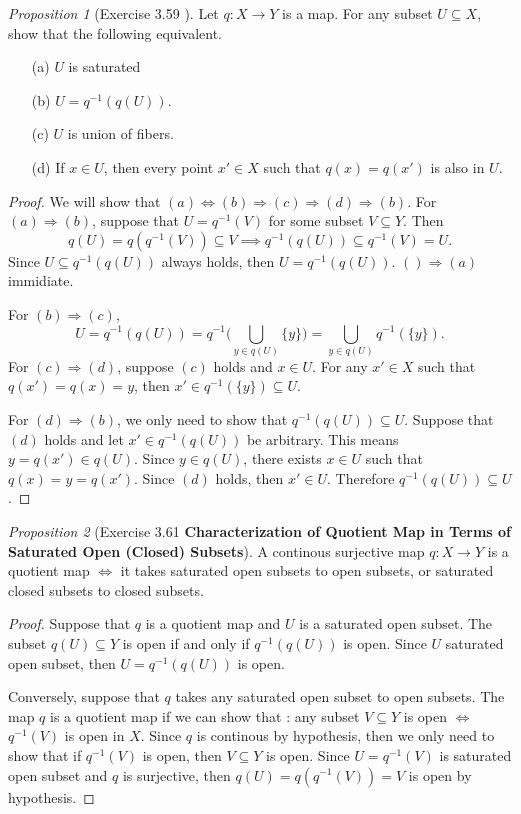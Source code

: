 \documentclass[a4paper]{article}
\theoremstyle{remark}
\newtheorem{prop}{Proposition}
\newcommand{\subhim}{\subseteq} %
\begin{document}
\begin{prop}[Exercise 3.59 \cite{LeeTM}]
	Let $q : X \to Y$ is a map. For any subset $U \subhim X$, show that the following equivalent.
	\begin{enumerate}[nolistsep]
		\item [(a)] $U$ is saturated 
		\item [(b)] $U = q^{-1}(q(U))$.
		\item [(c)] $U$ is union of fibers.
		\item [(d)] If $x \in U$, then every point $x'\in X$ such that $q(x) = q(x')$ is also in $U$.
	\end{enumerate}
\end{prop}
\begin{proof}
	We will show that $(a) \Leftrightarrow (b) \Rightarrow (c) \Rightarrow (d) \Rightarrow (b)$. For $(a) \Rightarrow (b)$, suppose that $U = q^{-1}(V)$ for some subset $V \subhim Y$. Then $$q(U) = q(q^{-1}(V)) \subhim V \implies q^{-1}(q(U)) \subhim q^{-1}(V) = U.$$
	Since $U \subhim q^{-1}(q(U))$ always holds, then $U = q^{-1}(q(U))$. $() \Rightarrow (a)$ immidiate.
	
	For $(b) \Rightarrow (c)$,
	$$
	U = q^{-1}(q(U)) = q^{-1}\big( \bigcup_{y \in q(U)} \{y\}  \big) = \bigcup_{y \in q(U)} q^{-1}(\{y\}).
	$$
	For $(c) \Rightarrow (d)$, suppose $(c)$ holds and $x \in U$. For any $x' \in X$ such that $q(x') = q(x)=y$, then $x' \in q^{-1}(\{y\}) \subhim U$.
	
	For $(d) \Rightarrow (b)$, we only need to show that $q^{-1}(q(U)) \subhim U$. Suppose that $(d)$ holds and let $x' \in q^{-1}(q(U))$ be arbitrary. This means $y = q(x') \in q(U)$. Since $y \in q(U)$, there exists $x \in U$ such that $q(x) = y = q(x')$. Since $(d)$ holds, then $x'\in U$. Therefore $q^{-1}(q(U)) \subhim U$.  
\end{proof}

\begin{prop}[Exercise 3.61 \cite{LeeTM} \textbf{Characterization of Quotient Map in Terms of Saturated Open (Closed) Subsets}]\label{Proposition 12}
	A continous surjective map $q: X \to Y$ is a quotient map $\Leftrightarrow$ it takes saturated open subsets to open subsets, or saturated closed subsets to closed subsets.  
\end{prop}
\begin{proof}
	Suppose that $q$ is a quotient map and $U$ is a saturated open subset. The subset $q(U) \subhim Y$ is open if and only if $q^{-1}(q(U))$ is open. Since $U$ saturated open subset, then $U = q^{-1}(q(U))$ is open. 
	
	Conversely, suppose that $q$ takes any saturated open subset to open subsets. The map $q$ is a quotient map if we can show that : any subset $V \subhim Y$ is open $\Leftrightarrow $ $q^{-1}(V)$ is open in $X$. Since $q$ is continous by hypothesis, then we only need to show that if $q^{-1}(V)$ is open, then $V\subhim Y$ is open. Since $U = q^{-1}(V)$ is saturated open subset and $q$ is surjective, then $q(U) = q(q^{-1}(V)) = V$ is open by hypothesis.  
  \end{proof}
\end{document}
